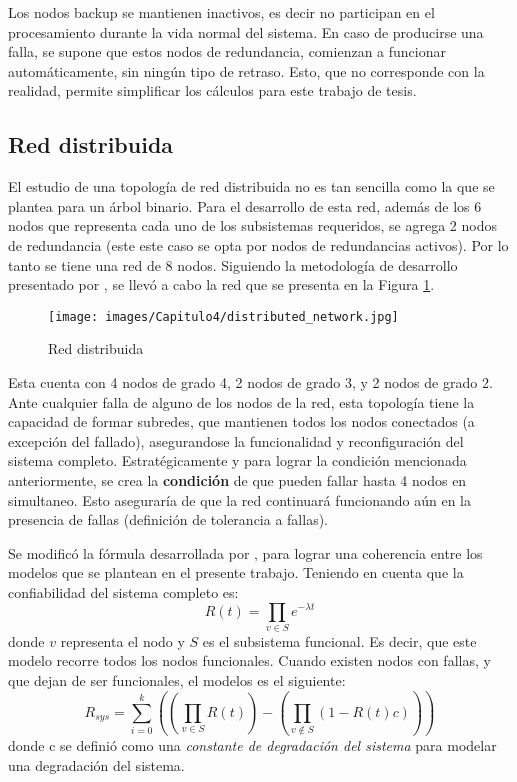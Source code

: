 Los nodos backup se mantienen inactivos, es decir no participan en el procesamiento durante la vida normal del sistema. En caso de producirse una falla, se supone que estos nodos de redundancia, comienzan a funcionar automáticamente, sin ningún tipo de retraso. Esto, que no corresponde con la realidad, permite simplificar los cálculos para este trabajo de tesis.


\subsection{Red distribuida}
El estudio de una topología de red distribuida no es tan sencilla como la que se plantea para un árbol binario. Para el desarrollo de esta red, además de los 6 nodos que representa cada uno de los subsistemas requeridos, se agrega 2 nodos de redundancia (este este caso se opta por nodos de redundancias activos). Por lo tanto se tiene una red de 8 nodos. Siguiendo la metodología de desarrollo presentado por \cite{Pradhan82}, se llevó a cabo la red que se presenta en la Figura \ref{fig:distributed_net}.

\begin{figure}[h]
 \centering
 \texttt{[image: images/Capitulo4/distributed\_network.jpg]}
  \caption{Red distribuida}
\label{fig:distributed_net}
\end{figure}

Esta cuenta con 4 nodos de grado 4, 2 nodos de grado 3, y 2 nodos de grado 2. Ante cualquier falla de alguno de los nodos de la red, esta topología tiene la capacidad de formar subredes, que mantienen todos los nodos conectados (a excepción del fallado), asegurandose la funcionalidad y reconfiguración del sistema completo. Estratégicamente y para lograr la condición mencionada anteriormente, se crea la \textbf{condición} de que pueden fallar hasta 4 nodos en simultaneo. Esto aseguraría de que la red continuará funcionando aún en la presencia de fallas (definición de tolerancia a fallas).

Se modificó la fórmula desarrollada  por \cite{Stivaros92}, para lograr una coherencia entre los modelos que se plantean en el presente trabajo. Teniendo en cuenta que la confiabilidad del sistema completo es: $$R(t) = \prod_{v \in S} e^{- \lambda t}$$
donde $v$ representa el nodo y $S$ es el subsistema funcional. Es decir, que este modelo recorre todos los nodos funcionales. Cuando existen nodos con fallas, y que dejan de ser funcionales, el modelos es el siguiente: $$R_{sys} =\sum_{i=0}^{k} (( \prod_{v \in S} R(t)) - (\prod_{v \notin S} (1 -  R(t) c )))$$
donde c se definió como una \textit{constante de degradación del sistema} para modelar una degradación del sistema.

